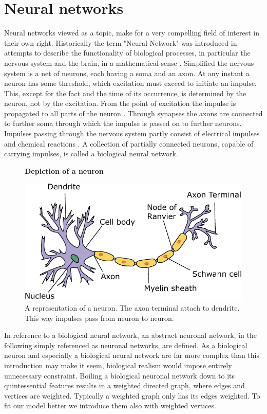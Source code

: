 \documentclass{article}
\theoremstyle{definition}
\newcommand*{\figuretitle}[1]{%
    {\centering%
    \textbf{#1}%
    \par\medskip}%
}
\begin{document}
\newpage

\section{Neural networks}
\label{sec:neural_networks}
Neural networks viewed as a topic, make for a very compelling field of interest in their own right. Historically the term "Neural Network" was introduced in attempts to describe the functionality of biological processes, in particular the nervous system and the brain, in a mathematical sense \cite{mcculloch1943logical, widrow1960adaptive, rumelhart1986learning}. Simplified the nervous system is a net of neurons, each having a soma and an axon. At any instant a neuron has some threshold, which excitation must exceed to initiate an impulse. This, except for the fact and the time of its occurrence, is determined by the neuron, not by the excitation. From the point of excitation the impulse is propagated to all parts of the neuron \cite{mcculloch1943logical}. Through synapses the axons are connected to further soma through which the impulse is passed on to further neurons. Impulses passing through the nervous system partly consist of electrical impulses and chemical reactions \cite{palay1956synapses}. A collection of partially connected neurons, capable of carrying impulses, is called a biological neural network.


\begin{figure}[H]
\centering
\figuretitle{Depiction of a neuron}
\includegraphics[scale=0.75]{graphics/neuron.pdf}
\caption{A representation of a neuron. The axon terminal attach to dendrite. This way impulses pass from neuron to neuron.}
\label{fig:neuron}
\end{figure}

In reference to a biological neural network, an abstract neuronal network, in the following simply referenced as neuronal networks, are defined. As a biological neuron and especially a biological neural network are far more complex than this introduction may make it seem, biological realism would impose entirely unnecessary constraint. Boiling a biological neuronal network down to its quintessential features results in a weighted directed graph, where edges and vertices are weighted. Typically a weighted graph only has its edges weighted. To fit our model better we introduce them also with weighted vertices.
\end{document}
